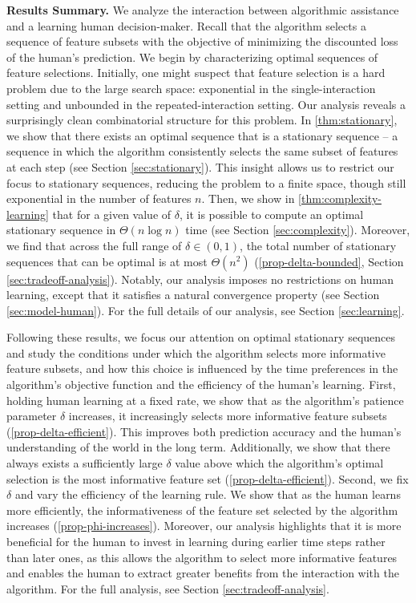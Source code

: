 \vspace{5pt} \noindent  \textbf{Results Summary.}
We analyze the interaction between algorithmic assistance and a learning human decision-maker. {Recall that the algorithm selects a sequence of feature subsets with the objective of minimizing the discounted loss of the human's prediction.}
We begin by characterizing optimal sequences of feature selections. Initially, one might suspect that feature selection is a hard problem due to the large search space: {exponential in the single-interaction setting and unbounded in the repeated-interaction setting.}
Our analysis reveals a surprisingly clean combinatorial structure for this problem. In \cref{thm:stationary}, we show that there exists an optimal sequence that is a stationary sequence -- a sequence in which the algorithm consistently selects the same subset of features at each step (see Section \ref{sec:stationary}). This insight allows us to restrict our focus to stationary sequences, reducing the problem to a finite space, though still exponential in the number of features $n$. Then, we show in \cref{thm:complexity-learning} that for a given value of $\delta$, it is possible to compute an optimal stationary sequence in $\Theta(n \log n)$ time (see Section \ref{sec:complexity}). Moreover, we find that across the full range of $\delta \in (0,1)$, the total number of stationary sequences that can be optimal is at most $\Theta(n^2)$ (\cref{prop-delta-bounded}, Section \ref{sec:tradeoff-analysis}). Notably, our analysis imposes no restrictions on human learning, except that it satisfies a natural convergence property (see Section \ref{sec:model-human}). 
For the full details of our analysis, see Section \ref{sec:learning}.


Following these results, we focus our attention on optimal stationary sequences and study the conditions under which the algorithm selects more informative feature subsets, and how this choice is influenced by the time preferences in the algorithm's objective function and the efficiency of the human's learning. 
%
First, holding human learning at a fixed rate, we show that as the algorithm's patience parameter $\delta$ increases, it increasingly selects more informative feature subsets (\cref{prop-delta-efficient}). This improves both prediction accuracy and the human's understanding of the world in the long term. Additionally, we show that there always exists a sufficiently large $\delta$ value above which the algorithm's optimal selection is the most informative feature set (\cref{prop-delta-efficient}). Second, we fix $\delta$ and vary the efficiency of the learning rule. We show that as the human learns more efficiently, the informativeness of the feature set selected by the algorithm increases (\cref{prop-phi-increases}). Moreover, our analysis highlights that it is more beneficial for the human to invest in learning during earlier time steps rather than later ones, as this allows the algorithm to select more informative features and enables the human to extract greater benefits from the interaction with the algorithm.  For the full analysis, see Section \ref{sec:tradeoff-analysis}.




